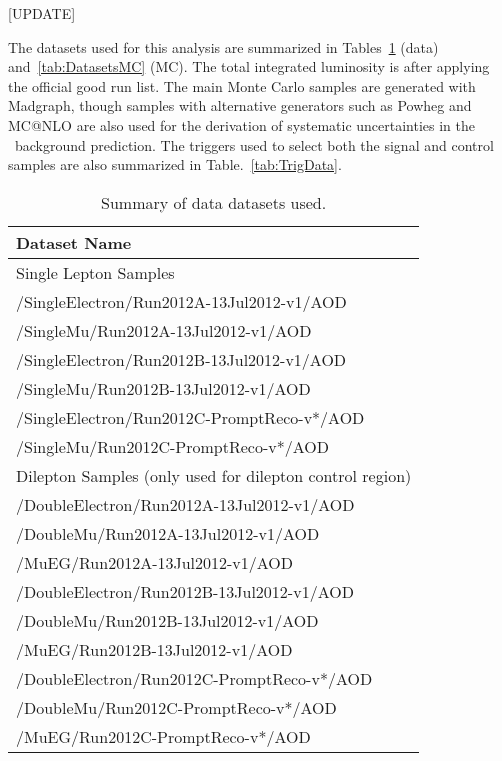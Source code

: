 
[UPDATE]

The datasets used for this analysis are summarized in 
Tables~\ref{tab:DatasetsData} (data) and~\ref{tab:DatasetsMC} (MC).
The total integrated luminosity is \lumi after
applying the official good run list. The main Monte Carlo
samples are generated with Madgraph, though samples with
alternative generators such as Powheg and MC@NLO are also used for
the derivation of systematic uncertainties in the \ttbar~background prediction. 
The triggers used to select both the signal and control samples are
also summarized in Table.~\ref{tab:TrigData}.

\begin{table}[!ht]
\begin{center}
\begin{tabular}{l}
\hline
Dataset Name   \\
\hline
\hline
Single Lepton Samples \\
\hline
  /SingleElectron/Run2012A-13Jul2012-v1/AOD   \\
  /SingleMu/Run2012A-13Jul2012-v1/AOD   \\
  /SingleElectron/Run2012B-13Jul2012-v1/AOD   \\
  /SingleMu/Run2012B-13Jul2012-v1/AOD   \\
  /SingleElectron/Run2012C-PromptReco-v*/AOD   \\         
  /SingleMu/Run2012C-PromptReco-v*/AOD   \\         
\hline
\hline
Dilepton Samples (only used for dilepton control region)\\
\hline
  /DoubleElectron/Run2012A-13Jul2012-v1/AOD   \\
  /DoubleMu/Run2012A-13Jul2012-v1/AOD   \\
  /MuEG/Run2012A-13Jul2012-v1/AOD   \\
  /DoubleElectron/Run2012B-13Jul2012-v1/AOD   \\
  /DoubleMu/Run2012B-13Jul2012-v1/AOD   \\
  /MuEG/Run2012B-13Jul2012-v1/AOD   \\
  /DoubleElectron/Run2012C-PromptReco-v*/AOD   \\         
  /DoubleMu/Run2012C-PromptReco-v*/AOD   \\         
  /MuEG/Run2012C-PromptReco-v*/AOD   \\         
\hline
\end{tabular}
\caption{Summary of data datasets used.\label{tab:DatasetsData}}
\end{center}
\end{table}

